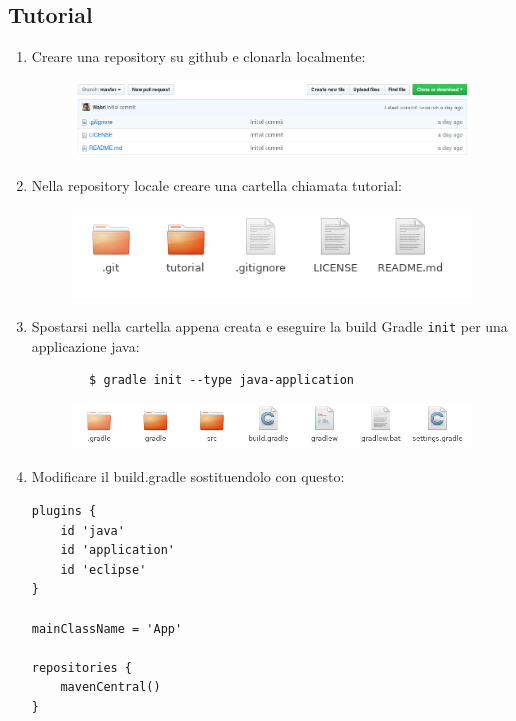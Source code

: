 \subsection{Tutorial}
\begin{enumerate}
    \item Creare una repository su github e clonarla localmente:
    \begin{figure}[H]
    \centering
    \includegraphics[width=1\linewidth]{4IntegrationWithOtherTool/tutorial/githubRepo.png}
    \end{figure}
    \item Nella repository locale creare una cartella chiamata tutorial:
    \begin{figure}[H]
    \centering
    \includegraphics[width=0.7\linewidth]{4IntegrationWithOtherTool/tutorial/localGithubRepo.png}
    \end{figure}
    \item Spostarsi nella cartella appena creata e eseguire la build Gradle \texttt{init} per una applicazione java:
    \begin{verbatim}
        $ gradle init --type java-application
    \end{verbatim}
    \begin{figure}[H]
    \centering
    \includegraphics[width=0.8\linewidth]{4IntegrationWithOtherTool/tutorial/gradleInit.png}
    \end{figure}
    \item Modificare il build.gradle sostituendolo con questo:
    \begin{lstlisting}[frame=single]
plugins {
    id 'java'
    id 'application'
    id 'eclipse'
}

mainClassName = 'App'

repositories {
    mavenCentral()
}


\end{lstlisting}
\end{enumerate}
